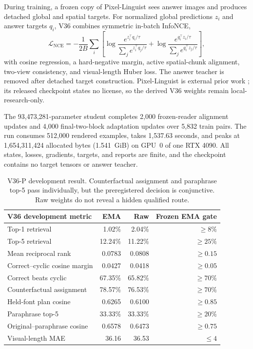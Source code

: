 \documentclass[11pt]{article}
\begin{document}
During training, a frozen copy of Pixel-Linguist sees answer images and
produces detached global and spatial targets. For normalized global predictions
\(z_i\) and answer targets \(q_i\), V36 combines symmetric in-batch
InfoNCE,
\[
\mathcal L_{\mathrm{NCE}}=-\frac{1}{2B}\sum_i\left[
\log\frac{e^{z_i^\top q_i/\tau}}{\sum_j e^{z_i^\top q_j/\tau}}
+\log\frac{e^{q_i^\top z_i/\tau}}{\sum_j e^{q_i^\top z_j/\tau}}\right],
\]
with cosine regression, a hard-negative margin, active spatial-chunk alignment,
two-view consistency, and visual-length Huber loss. The answer teacher is
removed after detached target construction. Pixel-Linguist is external prior
work \cite{pixelsentence}; its released checkpoint states no license, so the
derived V36 weights remain local-research-only.

The 93,473,281-parameter student completes 2,000 frozen-reader alignment
updates and 4,000 final-two-block adaptation updates over 5,832 train pairs.
The run consumes 512,000 rendered examples, takes 1,537.63 seconds, and peaks
at 1,654,311,424 allocated bytes (1.541~GiB) on GPU~0 of one RTX 4090. All
states, losses, gradients, targets, and reports are finite, and the checkpoint
contains no target tensors or answer teacher.

\begin{table}[h!]
\centering
\small
\begin{tabular}{lrrr}
\toprule
V36 development metric & EMA & Raw & Frozen EMA gate \\
\midrule
Top-1 retrieval & 1.02\% & 2.04\% & \(\geq 8\%\) \\
Top-5 retrieval & 12.24\% & 11.22\% & \(\geq 25\%\) \\
Mean reciprocal rank & 0.0783 & 0.0808 & \(\geq 0.15\) \\
Correct--cyclic cosine margin & 0.0427 & 0.0418 & \(\geq 0.05\) \\
Correct beats cyclic & 67.35\% & 65.82\% & \(\geq 70\%\) \\
Counterfactual assignment & 78.57\% & 76.53\% & \(\geq 70\%\) \\
Held-font plan cosine & 0.6265 & 0.6100 & \(\geq 0.85\) \\
Paraphrase top-5 & 33.33\% & 33.33\% & \(\geq 20\%\) \\
Original--paraphrase cosine & 0.6578 & 0.6473 & \(\geq 0.75\) \\
Visual-length MAE & 36.16 & 36.53 & \(\leq 4\) \\
\bottomrule
\end{tabular}
\caption{V36-P development result. Counterfactual assignment and
paraphrase top-5 pass individually, but the preregistered decision is
conjunctive. Raw weights do not reveal a hidden qualified route.}
\label{tab:v36semantic}
\end{table}
\end{document}

